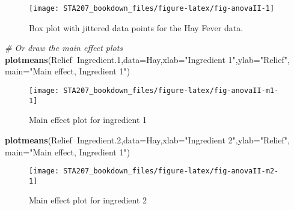 \documentclass[12pt,]{book}
\newenvironment{Shaded}{\begin{snugshade}}{\end{snugshade}}
\newcommand{\KeywordTok}[1]{\textcolor[rgb]{0.13,0.29,0.53}{\textbf{#1}}}
\newcommand{\DataTypeTok}[1]{\textcolor[rgb]{0.13,0.29,0.53}{#1}}
\newcommand{\DecValTok}[1]{\textcolor[rgb]{0.00,0.00,0.81}{#1}}
\newcommand{\StringTok}[1]{\textcolor[rgb]{0.31,0.60,0.02}{#1}}
\newcommand{\CommentTok}[1]{\textcolor[rgb]{0.56,0.35,0.01}{\textit{#1}}}
\newcommand{\OperatorTok}[1]{\textcolor[rgb]{0.81,0.36,0.00}{\textbf{#1}}}
\newcommand{\NormalTok}[1]{#1}
\begin{document}
\begin{figure}

{\centering \texttt{[image: STA207\_bookdown\_files/figure-latex/fig-anovaII-1]} 

}

\caption{Box plot with jittered data points for the Hay Fever data.}\label{fig:fig-anovaII}
\end{figure}

\begin{Shaded}
\begin{Highlighting}[]
\CommentTok{# Or draw the main effect plots }
\KeywordTok{plotmeans}\NormalTok{(Relief}\OperatorTok{~}\NormalTok{Ingredient.}\DecValTok{1}\NormalTok{,}\DataTypeTok{data=}\NormalTok{Hay,}\DataTypeTok{xlab=}\StringTok{"Ingredient 1"}\NormalTok{,}\DataTypeTok{ylab=}\StringTok{"Relief"}\NormalTok{, }\DataTypeTok{main=}\StringTok{"Main  effect, Ingredient 1"}\NormalTok{) }
\end{Highlighting}
\end{Shaded}

\begin{figure}

{\centering \texttt{[image: STA207\_bookdown\_files/figure-latex/fig-anovaII-m1-1]} 

}

\caption{Main effect plot for ingredient 1}\label{fig:fig-anovaII-m1}
\end{figure}

\begin{Shaded}
\begin{Highlighting}[]
\KeywordTok{plotmeans}\NormalTok{(Relief}\OperatorTok{~}\NormalTok{Ingredient.}\DecValTok{2}\NormalTok{,}\DataTypeTok{data=}\NormalTok{Hay,}\DataTypeTok{xlab=}\StringTok{"Ingredient 2"}\NormalTok{,}\DataTypeTok{ylab=}\StringTok{"Relief"}\NormalTok{, }\DataTypeTok{main=}\StringTok{"Main  effect, Ingredient 1"}\NormalTok{) }
\end{Highlighting}
\end{Shaded}

\begin{figure}

{\centering \texttt{[image: STA207\_bookdown\_files/figure-latex/fig-anovaII-m2-1]} 

}

\caption{Main effect plot for ingredient 2}\label{fig:fig-anovaII-m2}
\end{figure}
\end{document}
